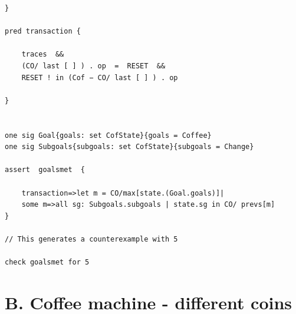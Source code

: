 \documentclass[a4paper,10pt]{report}
\begin{document}
\begin{verbatim}
}

pred transaction {

	traces  &&
	(CO/ last [ ] ) . op  =  RESET  &&
	RESET ! in (Cof − CO/ last [ ] ) . op

}


one sig Goal{goals: set CofState}{goals = Coffee}
one sig Subgoals{subgoals: set CofState}{subgoals = Change}

assert  goalsmet  {

	transaction=>let m = CO/max[state.(Goal.goals)]| 
	some m=>all sg: Subgoals.subgoals | state.sg in CO/ prevs[m]
}

// This generates a counterexample with 5

check goalsmet for 5
\end{verbatim}

\section{B.  Coffee machine - different coins}
\end{document}
